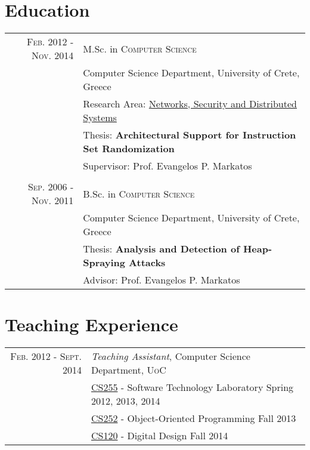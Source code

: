 \documentclass[a4paper,10pt]{article} %
\begin{document}
\section{Education}

\begin{tabular}{rl}	

\textsc{Feb. 2012 - Nov. 2014} & M.Sc. in \textsc{Computer Science} \\
& Computer Science Department, University of Crete, Greece \\
& Research Area: \href{https://www.csd.uoc.gr/CSD/index.jsp?content=research&lang=en&ri=5}{Networks, Security and Distributed Systems}\\
& Thesis: \textbf{Architectural Support for Instruction Set Randomization} \\
& Supervisor: Prof. Evangelos P. Markatos \\
\\

\textsc{Sep. 2006 - Nov. 2011} & B.Sc. in \textsc{Computer Science} \\
& Computer Science Department, University of Crete, Greece \\
& Thesis: \textbf{Analysis and Detection of Heap-Spraying Attacks} \\
& Advisor: Prof. Evangelos P. Markatos \\

\end{tabular}


\section{Teaching Experience}

\begin{tabular}{rl}

\textsc{Feb. 2012 - Sept. 2014} & \emph{Teaching Assistant}, Computer Science Department, \textsc{UoC} \\
& \href{https://www.csd.uoc.gr/CSD/index.jsp?content=courses_catalog&course=19}{CS255} - Software Technology Laboratory \small Spring 2012, 2013, 2014 \\
& \href{https://www.csd.uoc.gr/~hy252/html/instructional_material.html}{CS252} - Object-Oriented Programming \small Fall 2013\\
& \href{https://www.csd.uoc.gr/~hy120/18f/engl_cont.html}{CS120} - Digital Design \small Fall 2014
\\

\end{tabular}
\end{document}
